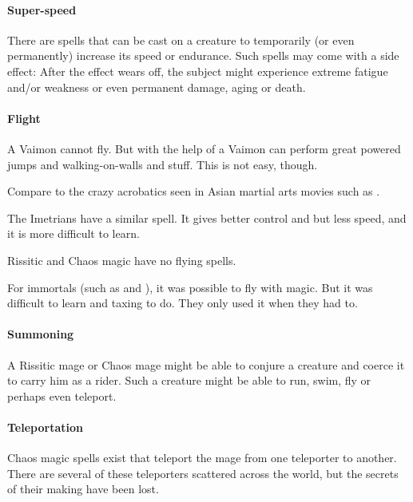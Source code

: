 \paragraph{Super-speed}
  There are spells that can be cast on a creature to temporarily (or even permanently) increase its speed or endurance. 
  Such spells may come with a side effect: 
  After the effect wears off, the subject might experience extreme fatigue and/or weakness or even permanent damage, aging or death. 



\paragraph{Flight}
  A Vaimon cannot fly. 
  But with the help of \Atzirah a Vaimon can perform great powered jumps and walking-on-walls and stuff. 
  This is not easy, though. 
  
  Compare to the crazy acrobatics seen in Asian martial arts movies such as \cite{Movie:CrouchingTigerHiddenDragon}.
  
  The Imetrians have a similar spell. 
  It gives better control and \manoeuvrability but less speed, and it is more difficult to learn. 
  
  Rissitic and Chaos magic have no flying spells. 
  
  For immortals (such as \quiljaaran and \bezed \resphain), it was possible to fly with magic.
  But it was difficult to learn and taxing to do. 
  They only used it when they had to. 
  



\paragraph{Summoning}
  A Rissitic mage or Chaos mage might be able to conjure a creature and coerce it to carry him as a rider. 
  Such a creature might be able to run, swim, fly or perhaps even teleport. 



\paragraph{Teleportation}
  Chaos magic spells exist that teleport the mage from one teleporter to another. 
  There are several of these teleporters scattered across the world, but the secrets of their making have been lost. 





